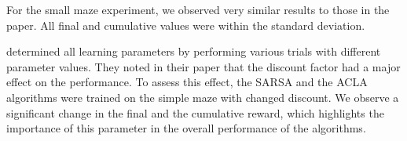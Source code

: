 \documentclass[letterpaper]{article}
\begin{document}
For the small maze experiment, we observed very similar results to those
in the paper. All final and cumulative values were within the standard
deviation.

\cite{wiering2008} determined all learning parameters by performing various
trials with different parameter values. They noted in their paper that
the discount factor had a major effect on the performance. To assess
this effect, the SARSA and the ACLA algorithms were trained on the
simple maze with changed discount. We observe a significant change in
the final and the cumulative reward, which highlights the importance of
this parameter in the overall performance of the algorithms.

\footnotesize


\end{document}
